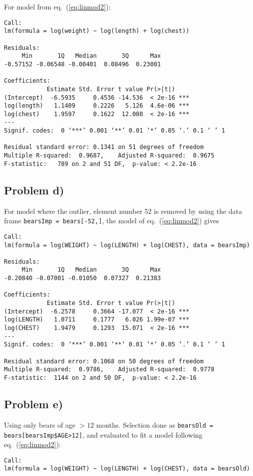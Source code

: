 \documentclass[a4paper,11pt]{article}
\begin{document}
For model from eq.~(\ref{eq:linmod2});
{\footnotesize
    \begin{verbatim}
Call:
lm(formula = log(weight) ~ log(length) + log(chest))

Residuals:
     Min       1Q   Median       3Q      Max 
-0.57152 -0.06548 -0.00401  0.08496  0.23001 

Coefficients:
            Estimate Std. Error t value Pr(>|t|)    
(Intercept)  -6.5935     0.4536 -14.536  < 2e-16 ***
log(length)   1.1409     0.2226   5.126  4.6e-06 ***
log(chest)    1.9597     0.1622  12.080  < 2e-16 ***
---
Signif. codes:  0 ‘***’ 0.001 ‘**’ 0.01 ‘*’ 0.05 ‘.’ 0.1 ‘ ’ 1

Residual standard error: 0.1341 on 51 degrees of freedom
Multiple R-squared:  0.9687,    Adjusted R-squared:  0.9675 
F-statistic:   789 on 2 and 51 DF,  p-value: < 2.2e-16
    \end{verbatim}

\subsection{Problem d)}
\label{app:d}
For model where the outlier, element number 52 is removed by using the data frame \texttt{bearsImp = bears[-52,]}, the model of eq.~(\ref{eq:linmod2}) gives
{\footnotesize
\begin{verbatim}
Call:
lm(formula = log(WEIGHT) ~ log(LENGTH) + log(CHEST), data = bearsImp)

Residuals:
     Min       1Q   Median       3Q      Max 
-0.20840 -0.07001 -0.01050  0.07327  0.21383 

Coefficients:
            Estimate Std. Error t value Pr(>|t|)    
(Intercept)  -6.2578     0.3664 -17.077  < 2e-16 ***
log(LENGTH)   1.0711     0.1777   6.026 1.99e-07 ***
log(CHEST)    1.9479     0.1293  15.071  < 2e-16 ***
---
Signif. codes:  0 ‘***’ 0.001 ‘**’ 0.01 ‘*’ 0.05 ‘.’ 0.1 ‘ ’ 1

Residual standard error: 0.1068 on 50 degrees of freedom
Multiple R-squared:  0.9786,    Adjusted R-squared:  0.9778 
F-statistic:  1144 on 2 and 50 DF,  p-value: < 2.2e-16
\end{verbatim}}

\subsection{Problem e)}
\label{app:e}
Using only bears of age $> 12$ months. Selection done as \texttt{bearsOld = bears[bearsImp\$AGE>12]}, and evaluated to fit a model following eq.~(\ref{eq:linmod2}):
{\footnotesize
\begin{verbatim}
Call:
lm(formula = log(WEIGHT) ~ log(LENGTH) + log(CHEST), data = bearsOld)


\end{verbatim}}}
\end{document}
